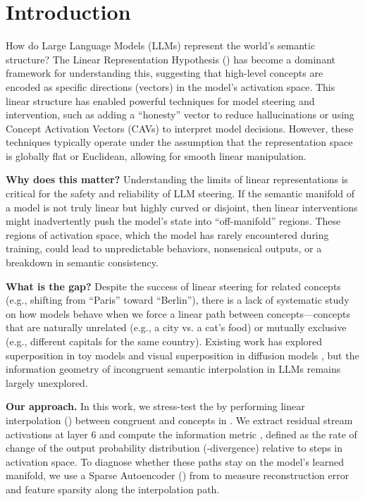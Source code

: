 \section{Introduction}

How do Large Language Models (LLMs) represent the world's semantic structure? The Linear Representation Hypothesis (\lrh) \cite{park2023linear} has become a dominant framework for understanding this, suggesting that high-level concepts are encoded as specific directions (vectors) in the model's activation space. This linear structure has enabled powerful techniques for model steering and intervention, such as adding a ``honesty'' vector to reduce hallucinations or using Concept Activation Vectors (CAVs) to interpret model decisions. However, these techniques typically operate under the assumption that the representation space is globally flat or Euclidean, allowing for smooth linear manipulation.

{\bf Why does this matter?} Understanding the limits of linear representations is critical for the safety and reliability of LLM steering. If the semantic manifold of a model is not truly linear but highly curved or disjoint, then linear interventions might inadvertently push the model's state into ``off-manifold'' regions. These regions of activation space, which the model has rarely encountered during training, could lead to unpredictable behaviors, nonsensical outputs, or a breakdown in semantic consistency.

{\bf What is the gap?} Despite the success of linear steering for related concepts (e.g., shifting from ``Paris'' toward ``Berlin''), there is a lack of systematic study on how models behave when we force a linear path between \incongruent concepts—concepts that are naturally unrelated (e.g., a city vs. a cat's food) or mutually exclusive (e.g., different capitals for the same country). Existing work has explored superposition in toy models \cite{elhage2022toy} and visual superposition in diffusion models \cite{white2022schrodinger}, but the information geometry of incongruent semantic interpolation in LLMs remains largely unexplored.

{\bf Our approach.} In this work, we stress-test the \lrh by performing linear interpolation (\lerp) between congruent and \incongruent concepts in \gpttwo. We extract residual stream activations at layer 6 and compute the information metric \cite{park2023linear}, defined as the rate of change of the output probability distribution (\kl-divergence) relative to steps in activation space. To diagnose whether these paths stay on the model's learned manifold, we use a Sparse Autoencoder (\sae) from \saelens \cite{cunningham2023sparse} to measure reconstruction error and feature sparsity along the interpolation path.

